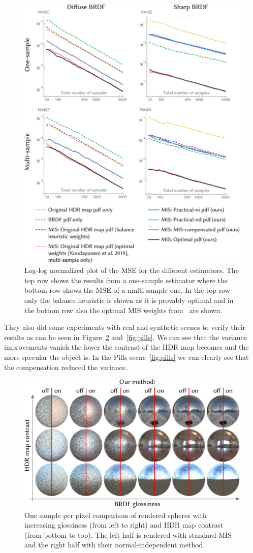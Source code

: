 \begin{figure}
    \centering
    \includegraphics[width=.7\textwidth]{images/error_plots.png}
    \caption{Log-log normalized plot of the MSE for the different estimators.
    The top row shows the results from a one-sample estimator where the bottom row shows the MSE of a multi-sample one.
    In the top row only the balance heuristic is shown as it is provably optimal
    and in the bottom row also the optimal MIS weights from~\cite{Kondapaneni2019} are shown.
    \cite[Figure~6]{Karlik2019}}
    \label{fig:error_plots}
\end{figure}

They also did some experiments with real and synthetic scenes to verify their results as can be seen in Figure~\ref{fig:sphere_comparison} and~\ref{fig:pills}.
We can see that the variance improvements vanish the lower the contrast of the HDR map becomes and the more specular the object is.
In the Pills scene~\ref{fig:pills} we can clearly see that the compensation reduced the variance.

\begin{figure}
    \centering
    \includegraphics[width=.6\textwidth]{images/sphere_comparison.png}
    \caption{One sample per pixel comparison of rendered spheres with increasing glossiness (from left to right) and HDR map contrast (from bottom to top).
    The left half is rendered with standard MIS and the right half with their normal-independent method.
    \cite[Figure~7]{Karlik2019}}
    \label{fig:sphere_comparison}
\end{figure}

